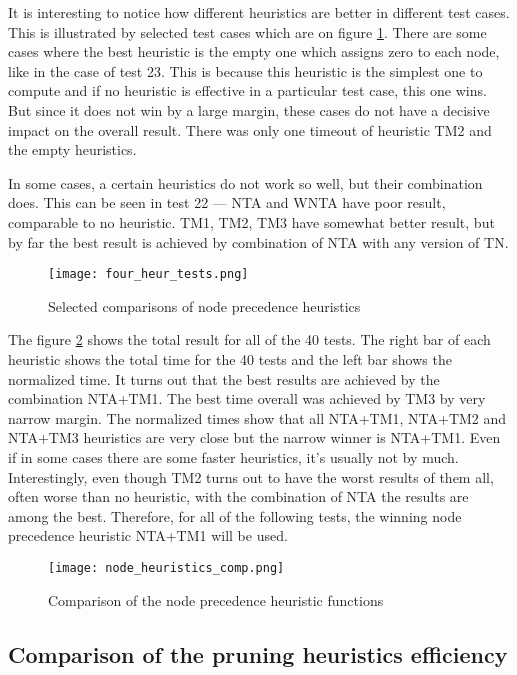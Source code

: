 It is interesting to notice how different heuristics are better in different test cases. This is illustrated by selected test cases which are on figure \ref{fig:selected_tests}. There are some cases where the best heuristic is the empty one which assigns zero to each node, like in the case of test 23. This is because this heuristic is the simplest one to compute and if no heuristic is effective in a particular test case, this one wins. But since it does not win by a large margin, these cases do not have a decisive impact on the overall result. There was only one timeout of heuristic TM2 and the empty heuristics.

In some cases, a certain heuristics do not work so well, but their combination does. This can be seen in test 22 --- NTA and WNTA have poor result, comparable to no heuristic. TM1, TM2, TM3 have somewhat better result, but by far the best result is achieved by combination of NTA with any version of TN.

\begin{figure}[h!]
  \texttt{[image: four\_heur\_tests.png]}
  \caption{Selected comparisons of node precedence heuristics}
  \label{fig:selected_tests}
\end{figure}

The figure \ref{fig:node_heuristics_comp} shows the total result for all of the 40 tests. The right bar of each heuristic shows the total time for the 40 tests and the left bar shows the normalized time. It turns out that the best results are achieved by the combination NTA+TM1. The best time overall was achieved by TM3 by very narrow margin. The normalized times show that all NTA+TM1, NTA+TM2 and NTA+TM3 heuristics are very close but the narrow winner is NTA+TM1. Even if in some cases there are some faster heuristics, it's usually not by much. Interestingly, even though TM2 turns out to have the worst results of them all, often worse than no heuristic, with the combination of NTA the results are among the best. Therefore, for all of the following tests, the winning node precedence heuristic NTA+TM1 will be used.

\begin{figure}[h!]
  \texttt{[image: node\_heuristics\_comp.png]}
  \caption{Comparison of the node precedence heuristic functions}
  \label{fig:node_heuristics_comp}
\end{figure}

\subsection{Comparison of the pruning heuristics efficiency}

